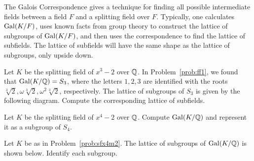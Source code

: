 The Galois Correspondence gives a technique for finding all possible intermediate fields between a field $F$ and a splitting field over $F$. Typically, one calculates $\operatorname{Gal}(K/F)$, uses known facts from group theory to construct the lattice of subgroups of $\operatorname{Gal}(K/F)$, and then uses the correspondence to find the lattice of subfields. The lattice of subfields will have the same shape as the lattice of subgroups, only upside down.

\begin{problem}
    Let $K$ be the splitting field of $x^3-2$ over $\mathbb{Q}$.
    In Problem~\ref{prob:ff1}, we found that $\operatorname{Gal}(K/\mathbb{Q}) = S_3$, where the letters $1,2,3$ are identified with the roots $\sqrt[3]{2}, \omega\sqrt[3]{2},\omega^2\sqrt[3]{2}$, respectively. The lattice of subgroups of $S_3$ is given by the following diagram. Compute the corresponding lattice of subfields.
\begin{center}\small
{}
\end{center}
\end{problem}

\begin{problem}\label{prob:sfx4m2}
    Let $K$ be the splitting field of $x^4-2$ over $\mathbb{Q}$. Compute $\operatorname{Gal}(K/\mathbb{Q})$ and represent it as a subgroup of $S_4$.
\end{problem}

\begin{problem}
    Let $K$ be as in Problem~\ref{prob:sfx4m2}. The lattice of subgroups of $\operatorname{Gal}(K/\mathbb{Q})$ is shown below. Identify each subgroup.
\begin{center}\small
{}
\end{center}
\end{problem}

